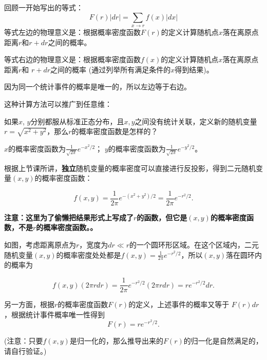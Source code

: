\documentclass[CJK]{beamer}
\begin{document}
\begin{frame}
\bch
{\large
回顾一开始写出的等式：
$$F(r) |dr| = \sum_{x\rightarrow r} f(x) |dx| $$
等式左边的物理意义是：根据概率密度函数$F(r)$的定义计算随机点$x$落在离原点距离$r$和$r+dr$之间的概率。

\skipline

等式右边的物理意义是：根据概率密度函数$f(x)$的定义计算随机点$x$落在离原点距离$r$和
$r+dr$之间的概率 (通过列举所有满足条件的$x$得到结果)。

\skipline
因为同一个统计事件的概率是唯一的，所以左边等于右边。

\skipline

 这种计算方法可以推广到任意维： 
}
\ech
\end{frame}


\begin{frame}
\bch
{}
{\large
如果$x$, $y$分别都服从标准正态分布，且$x,y$之间没有统计关联，定义新的随机变量$r=\sqrt{x^2+y^2}$，那么$r$的概率密度函数是怎样的？
}
\ech
\end{frame}


\begin{frame}
    \bch
    {\large
      $x$的概率密度函数为$\frac{1}{\sqrt{2\pi}}e^{-x^2/2}$； $y$的概率密度函数为$\frac{1}{\sqrt{2\pi}}e^{-y^2/2}$。

      \skipline
      
      根据上节课所讲，{\bf 独立}随机变量的概率密度可以直接进行反投影，得到二元随机变量$(x,y)$的概率密度函数：

      $$ f(x,y) = \frac{1}{2\pi}e^{-(x^2+y^2)/2} = \frac{1}{2\pi}e^{-r^2/2}.$$

      {\bf 注意：这里为了偷懒把结果形式上写成了$r$的函数，但它是$(x,y)$的概率密度函数，不是$r$的概率密度函数。。}}
\ech
\end{frame}

\begin{frame}
\bch
{}
\emini
{}
{\large
  如图，考虑距离原点为$r$，宽度为$dr\ll r$的一个圆环形区域。在这个区域内，二元随机变量$(x,y)$的概率密度处处都是$f(x,y)=\frac{1}{2\pi}e^{-r^2/2}$，所以$(x,y)$落在圆环内的概率为}
\emini
    {
     \large
  $$ f(x,y) (2\pi r dr) = \frac{1}{2\pi}e^{-r^2/2} (2\pi r dr) = re^{-r^2/2}dr. $$
  

  另一方面，根据$r$的概率密度函数$F(r)$的定义，上述事件的概率又等于 $F(r)dr$，根据统计事件概率唯一性得到
  $$F(r) = r e^{-r^2/2}. $$

  (注意：只要$f(x,y)$是归一化的，那么推导出来的$F(r)$的归一化是自然满足的，请自行验证。)
}
\ech
\end{frame}
\end{document}
